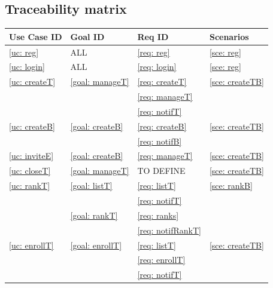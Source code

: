     \subsection{Traceability matrix}
    \begin{table}[h]
	    \centering
            \renewcommand{\arraystretch}{1.5}
            \begin{tabular}{|m{3cm}|m{3cm}|m{3cm}|m{3cm}|}
                \hline
                \textbf{Use Case ID} & \textbf{Goal ID} & \textbf{Req ID} & \textbf{Scenarios} \\
                \hline
                \ref{uc: reg} & ALL & \ref{req: reg} & \ref{sce: reg}  \\
                \hline
                \ref{uc: login} & ALL & \ref{req: login} & \ref{sce: reg}   \\
                \hline
                \ref{uc: createT} & \ref{goal: manageT} & \ref{req: createT} & \ref{sce: createTB}   \\
                \null & \null  & \ref{req: manageT}&\null \\
                \null & \null  & \ref{req: notifT}&\null \\
                \hline
                \ref{uc: createB} & \ref{goal: createB} & \ref{req: createB} & \ref{sce: createTB}  \\
                \null & \null  & \ref{req: notifB}&\null \\
                \hline
                \ref{uc: inviteE} & \ref{goal: createB} & \ref{req: manageT} & \ref{sce: createTB}  \\
                \hline
                \ref{uc: closeT} & \ref{goal: manageT} & TO DEFINE & \ref{sce: createTB}  \\
                \hline
                \ref{uc: rankT} & \ref{goal: listT} & \ref{req: listT} & \ref{sce: rankB}  \\
                \null & \null  & \ref{req: notifT}&\null \\
                \null & \ref{goal: rankT}  & \ref{req: ranks}&\null \\
                \null & \null  & \ref{req: notifRankT}&\null \\
                \hline
                \ref{uc: enrollT} & \ref{goal: enrollT} & \ref{req: listT} & \ref{sce: createTB}  \\
                \null & \null  & \ref{req: enrollT}&\null \\
                \null & \null  & \ref{req: notifT}&\null \\

\end{tabular}
\end{table}
